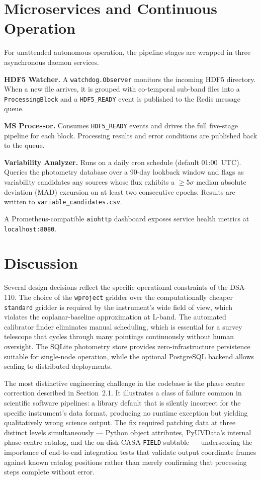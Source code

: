 \documentclass[12pt,a4paper]{article}
\newcommand{\code}[1]{\colorbox{codegray}{\texttt{\small #1}}}
\begin{document}
\section{Microservices and Continuous Operation}

For unattended autonomous operation, the pipeline stages are wrapped in three
asynchronous daemon services.

\textbf{HDF5 Watcher.}  A \code{watchdog.Observer} monitors the incoming HDF5
directory.  When a new file arrives, it is grouped with co-temporal sub-band
files into a \code{ProcessingBlock} and a \code{HDF5\_READY} event is
published to the Redis message queue.

\textbf{MS Processor.}  Consumes \code{HDF5\_READY} events and drives the
full five-stage pipeline for each block.  Processing results and error
conditions are published back to the queue.

\textbf{Variability Analyzer.}  Runs on a daily cron schedule (default
01:00~UTC).  Queries the photometry database over a 90-day lookback window
and flags as variability candidates any sources whose flux exhibits a
$\geq 5\sigma$ median absolute deviation (MAD) excursion on at least two
consecutive epochs.  Results are written to \code{variable\_candidates.csv}.

A Prometheus-compatible \texttt{aiohttp} dashboard exposes service health
metrics at \code{localhost:8080}.

\section{Discussion}

Several design decisions reflect the specific operational constraints of the
DSA-110.  The choice of the \code{wproject} gridder over the computationally
cheaper \code{standard} gridder is required by the instrument's wide field of
view, which violates the coplanar-baseline approximation at L-band.  The
automated calibrator finder eliminates manual scheduling, which is essential
for a survey telescope that cycles through many pointings continuously without
human oversight.  The SQLite photometry store provides zero-infrastructure
persistence suitable for single-node operation, while the optional PostgreSQL
backend allows scaling to distributed deployments.

The most distinctive engineering challenge in the codebase is the phase centre
correction described in Section~2.1.  It illustrates a class of failure common
in scientific software pipelines: a library default that is silently incorrect
for the specific instrument's data format, producing no runtime exception but
yielding qualitatively wrong science output.  The fix required patching data at
three distinct levels simultaneously --- Python object attributes, PyUVData's
internal phase-centre catalog, and the on-disk CASA \code{FIELD} subtable ---
underscoring the importance of end-to-end integration tests that validate
output coordinate frames against known catalog positions rather than merely
confirming that processing steps complete without error.
\end{document}
